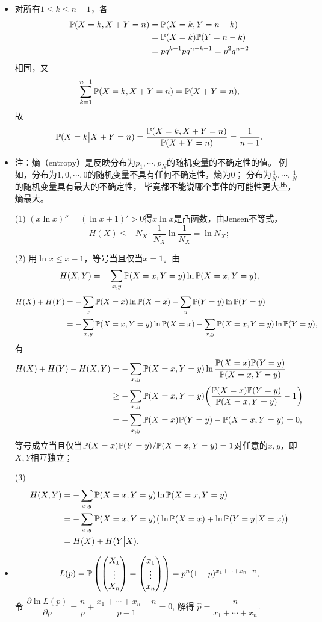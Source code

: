 \begin{itemize}
    \item[5.30]
    对所有$1\le k\le n-1$，各
    \begin{align*}\mathbb{P}(X=k,X+Y=n)&=\mathbb{P}(X=k,Y=n-k)\\
    &=\mathbb{P}(X=k)\mathbb{P}(Y=n-k)\\&=pq^{k-1}pq^{n-k-1}=p^2q^{n-2}\end{align*}
    相同，又
    $$\sum_{k=1}^{n-1}\mathbb{P}(X=k,X+Y=n)=\mathbb{P}(X+Y=n),$$
    故$$\mathbb{P}(X=k\big|X+Y=n)=\frac{\mathbb{P}(X=k,X+Y=n)}{\mathbb{P}(X+Y=n)}=\frac{1}{n-1}.$$
    
    \item[5.31]
    注：熵（entropy）是反映分布为$p_1,\cdots,p_N$的随机变量的不确定性的值。
    例如，分布为$1,0,\cdots,0$的随机变量不具有任何不确定性，熵为$0$；
    分布为$\frac1N,\cdots,\frac1N$的随机变量具有最大的不确定性，
    毕竟都不能说哪个事件的可能性更大些，熵最大。

    (1) $(x\ln x)''=(\ln x+1)'>0$得$x\ln x$是凸函数，由Jensen不等式，
    \[H(X)\le-N_X\cdot\frac{1}{N_X}\ln\frac{1}{N_X}=\ln N_X;\]

    (2) 用$\ln x\le x-1$，等号当且仅当$x=1$。由
    $$H(X,Y)=-\sum_{x,y}\mathbb{P}(X=x,Y=y)\ln\mathbb{P}(X=x,Y=y),$$
    \begin{align*}
        H(X)+H(Y)&=-\sum_x\mathbb{P}(X=x)\ln\mathbb{P}(X=x)-\sum_y\mathbb{P}(Y=y)\ln\mathbb{P}(Y=y)\\
        &=-\sum_{x,y}\mathbb{P}(X=x,Y=y)\ln\mathbb{P}(X=x)-\sum_{x,y}\mathbb{P}(X=x,Y=y)\ln\mathbb{P}(Y=y),
    \end{align*}
    有\begin{align*}
        H(X)+H(Y)-H(X,Y)
        &=-\sum_{x,y}\mathbb{P}(X=x,Y=y)\ln\frac{\mathbb{P}(X=x)\mathbb{P}(Y=y)}{\mathbb{P}(X=x,Y=y)}\\
        &\ge-\sum_{x,y}\mathbb{P}(X=x,Y=y)\bigg(\frac{\mathbb{P}(X=x)\mathbb{P}(Y=y)}{\mathbb{P}(X=x,Y=y)}-1\bigg)\\
        &=-\sum_{x,y}\mathbb{P}(X=x)\mathbb{P}(Y=y)-\mathbb{P}(X=x,Y=y)=0,
    \end{align*}
    等号成立当且仅当$\mathbb{P}(X=x)\mathbb{P}(Y=y)/\mathbb{P}(X=x,Y=y)=1$对任意的$x,y$，即$X,Y$相互独立；

    (3) \begin{align*}
        H(X,Y)&=-\sum_{x,y}\mathbb{P}(X=x,Y=y)\ln\mathbb{P}(X=x,Y=y)\\
        &=-\sum_{x,y}\mathbb{P}(X=x,Y=y)\big(\ln\mathbb{P}(X=x)+\ln\mathbb{P}(Y=y\big|X=x)\big)\\
        &=H(X)+H(Y\big|X).
    \end{align*}

    \item[5.34]
    \[
        L(p) = \mathbb{P} \left(
        \begin{pmatrix} X_1 \\ \vdots \\ X_n \end{pmatrix}
        = \begin{pmatrix} x_1 \\ \vdots \\ x_n \end{pmatrix}
        \right) = p^n (1-p)^{x_1 + \cdots + x_n - n},
    \]
    令 $\dfrac {\partial \ln L(p)} {\partial p} = \dfrac n p + \dfrac {x_1 + \cdots + x_n - n} {p-1} = 0$,
    解得 $\hat p = \dfrac n {x_1 + \cdots + x_n}$.
\end{itemize}

